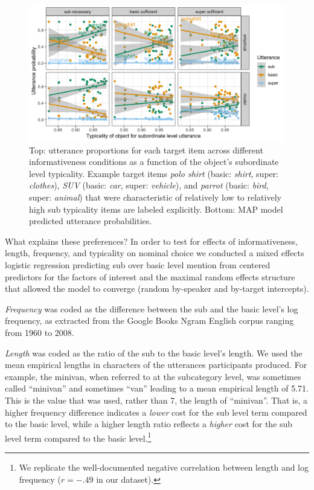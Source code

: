 \documentclass[11pt]{article}
\begin{document}
\begin{figure}
\centering
\includegraphics[width=\textwidth]{pics/results-exp3.png}
\caption{Top: utterance proportions for each target item across different informativeness conditions as a function of the object's subordinate level typicality. Example target items \emph{polo shirt} (basic: \emph{shirt}, super: \emph{clothes}),  \emph{SUV} (basic: \emph{car}, super: \emph{vehicle}), and \emph{parrot} (basic: \emph{bird}, super: \emph{animal}) that were characteristic of relatively low to relatively high sub typicality items are labeled explicitly. Bottom: MAP model predicted utterance probabilities.}
\label{fig:exp3results}
\end{figure}

What explains these preferences? In order to test for effects of informativeness, length, frequency, and typicality on nominal choice we conducted a mixed effects logistic regression predicting sub over basic level mention from centered predictors for the factors of interest and the maximal random effects structure that allowed the model to converge (random by-speaker and by-target intercepts).

\emph{Frequency} was coded as the difference between the sub and the basic level's log frequency, as extracted from the Google Books Ngram English corpus ranging from 1960 to 2008. 

\emph{Length} was coded as the ratio of the sub to the basic level's length. We used the mean empirical lengths in characters of the utterances participants produced. For example, the minivan, when referred to at the subcategory level, was sometimes called ``minivan'' and sometimes ``van'' leading to a mean empirical length of 5.71. This is the value that was used, rather than 7, the length of ``minivan''. That is, a higher frequency difference indicates a \emph{lower} cost for the sub level term compared to the basic level, while a higher length ratio reflects a \emph{higher} cost for the sub level term compared to the basic level.\footnote{We replicate the well-documented negative correlation between length and log frequency ($r = -.49$ in our dataset).} 
\end{document}
